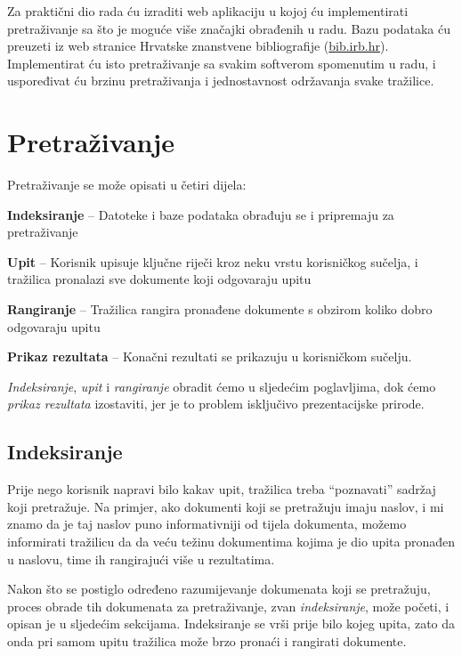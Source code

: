 \documentclass[a4paper,twoside,12pt]{scrreprt}
\begin{document}
Za praktični dio rada ću izraditi web aplikaciju u kojoj ću implementirati pretraživanje sa što je moguće više značajki obrađenih u radu. Bazu podataka ću preuzeti iz web stranice Hrvatske znanstvene bibliografije (\url{bib.irb.hr}). Implementirat ću isto pretraživanje sa svakim softverom spomenutim u radu, i uspoređivat ću brzinu pretraživanja i jednostavnost održavanja svake tražilice.

\chapter{Pretraživanje}


Pretraživanje se može opisati u četiri dijela:

\begin{compactenum}
  \item \textbf{Indeksiranje} – Datoteke i baze podataka obrađuju se i pripremaju za pretraživanje
  \item \textbf{Upit} – Korisnik upisuje ključne riječi kroz neku vrstu korisničkog sučelja, i tražilica pronalazi sve dokumente koji odgovaraju upitu
  \item \textbf{Rangiranje} – Tražilica rangira pronađene dokumente s obzirom koliko dobro odgovaraju upitu
  \item \textbf{Prikaz rezultata} – Konačni rezultati se prikazuju u korisničkom sučelju.
\end{compactenum}

\textit{Indeksiranje}, \textit{upit} i \textit{rangiranje} obradit ćemo u sljedećim poglavljima, dok ćemo \textit{prikaz rezultata} izostaviti, jer je to problem isključivo prezentacijske prirode.

\section{Indeksiranje}
\label{indexing}

Prije nego korisnik napravi bilo kakav upit, tražilica treba ``poznavati'' sadržaj koji pretražuje. Na primjer, ako dokumenti koji se pretražuju imaju naslov, i mi znamo da je taj naslov puno informativniji od tijela dokumenta, možemo informirati tražilicu da da veću težinu dokumentima kojima je dio upita pronađen u naslovu, time ih rangirajući više u rezultatima.

Nakon što se postiglo određeno razumijevanje dokumenata koji se pretražuju, proces obrade tih dokumenata za pretraživanje, zvan \textit{indeksiranje}, može početi, i opisan je u sljedećim sekcijama. Indeksiranje se vrši prije bilo kojeg upita, zato da onda pri samom upitu tražilica može brzo pronaći i rangirati dokumente.
\end{document}
